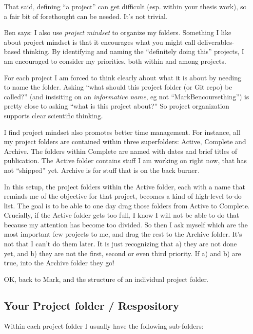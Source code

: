 \documentclass[12pt,letterpaper]{article}
\begin{document}
That said, defining ``a project'' can get difficult (esp. within your thesis work), so a fair bit of forethought can be needed.  It's not trivial.

Ben says: I also use \emph{project mindset} to organize my folders.  Something I like about project mindset is that it encourages what you might call deliverables-based thinking. By identifying and naming the ``definitely doing this'' projects, I am encouraged to consider my priorities, both within and among projects.

For each project I am forced to think clearly about what it is about by needing to name the folder. Asking ``what should this project folder (or Git repo) be called?'' (and insisiting on an \emph{informative name}, eg not ``MarkBencoursething'') is pretty close to asking ``what is this project about?'' So project organization supports clear scientific thinking.

I find project mindset also promotes better time management. For instance, all my project folders are contained within three superfolders: Active, Complete and Archive. The folders within Complete are named with dates and brief titles of publication. The Active folder contains stuff I am working on right now, that has not ``shipped'' yet. Archive is for stuff that is on the back burner.

In this setup, the project folders within the Active folder, each with a name that reminds me of the objective for that project, becomes a kind of high-level to-do list. The goal is to be able to one day drag those folders from Active to Complete. Crucially, if the Active folder gets too full, I know I will not be able to do that because my attention has become too divided. So then I ask myself which are the most important few projects to me, and drag the rest to the Archive folder. It's not that I can't do them later. It is just recognizing that a) they are not done yet, and b) they are not the first, second or even third priority. If a) and b) are true, into the Archive folder they go!

OK, back to Mark, and the structure of an individual project folder.

\subsection{Your Project folder / Respository} \label{projectfolder}
Within each project folder I  usually have the following sub-folders:
\end{document}
